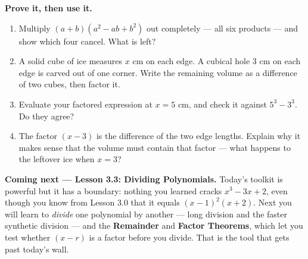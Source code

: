\documentclass[10pt]{article}
\begin{document}
\begin{extensionbox}
\textbf{Prove it, then use it.}
\begin{enumerate}[label=(\alph*), leftmargin=1.8em, itemsep=5pt]
  \item Multiply $(a + b)(a^2 - ab + b^2)$ out completely --- all six products --- and show which four
        cancel. What is left? 
  \item A solid cube of ice measures $x$ cm on each edge. A cubical hole $3$ cm on each edge is
        carved out of one corner. Write the remaining volume as a difference of two cubes, then
        factor it. 
  \item Evaluate your factored expression at $x = 5$ cm, and check it against
        $5^3 - 3^3$. Do they agree? 
  \item The factor $(x - 3)$ is the difference of the two edge lengths. Explain why it makes sense
        that the volume must contain that factor --- what happens to the leftover ice when $x = 3$?
\end{enumerate}
\end{extensionbox}

\begin{spiralbox}
\textbf{Coming next --- Lesson 3.3: Dividing Polynomials.} Today's toolkit is powerful but it has a
boundary: nothing you learned cracks $x^3 - 3x + 2$, even though you know from Lesson 3.0 that it
equals $(x-1)^2(x+2)$. Next you will learn to \emph{divide} one polynomial by another --- long
division and the faster synthetic division --- and the \textbf{Remainder} and \textbf{Factor
Theorems}, which let you test whether $(x-r)$ is a factor before you divide. That is the tool that
gets past today's wall.
\end{spiralbox}
\end{document}
